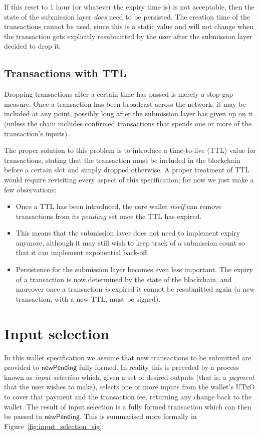 \documentclass{article}
\numberwithin{equation}{lemma}
\begin{document}
If this reset to 1 hour (or whatever the expiry time is) is not acceptable,
then the state of the submission layer \emph{does} need to be persisted.
The creation time of the transactions cannot be used, since this is a static
value and will not change when the transaction gets explicitly resubmitted
by the user after the submission layer decided to drop it.

\subsection{Transactions with TTL}
\label{sec:TTL}

Dropping transactions after a certain time has passed is merely a stop-gap
measure. Once a transaction has been broadcast across the network, it may be
included at any point, possibly long after the submission layer has given up on
it (unless the chain includes confirmed transactions that spends one or more of
the transaction's inputs).

The proper solution to this problem is to introduce a time-to-live (TTL) value
for transactions, stating that the transaction must be included in the
blockchain before a certain slot and simply dropped otherwise. A proper treatment
of TTL would require revisiting every aspect of this specification; for now
we just make a few observations:

\begin{itemize}
\item Once a TTL has been introduced, the core wallet \emph{itself} can remove
transactions from its $\mathit{pending}$ set once the TTL has expired.
\item This means that the submission layer does not need to implement expiry
anymore, although it may still wish to keep track of a submission count so that
it can implement exponential back-off.
\item Persistence for the submission layer becomes even less important.
The expiry of a transaction is now determined by the state of the blockchain,
and moreover once a transaction \emph{is} expired it cannot be resubmitted again
(a new transaction, with a new TTL, must be signed).
\end{itemize}

\section{Input selection}
\label{sec:input_selection}

In this wallet specification we assume that new transactions to be submitted are
provided to $\mathsf{newPending}$ fully formed. In reality this is preceded by a
process known as \emph{input selection} which, given a set of desired outputs
(that is, a \emph{payment} that the user wishes to make), selects one or more
inputs from the wallet's UTxO to cover that payment and the transaction fee,
returning any change back to the wallet. The result of input selection is a
fully formed transaction which can then be passed to $\mathsf{newPending}$. This
is summarised more formally in Figure~\ref{fig:input_selection_sig}.
\end{document}
